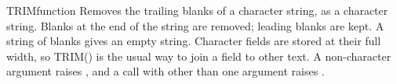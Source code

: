 \begin{XbaseEntry}{TRIM}{function}
Removes the trailing blanks of a character string, as a character string.
\Syntax
{}
\Usage
Blanks at the end of the string are removed; leading blanks are kept. A string of blanks gives an empty string. Character fields are stored at their full width, so TRIM() is the usual way to join a field to other text. A non-character argument raises , and a call with other than one argument raises .
\Examples
{}
\end{XbaseEntry}

